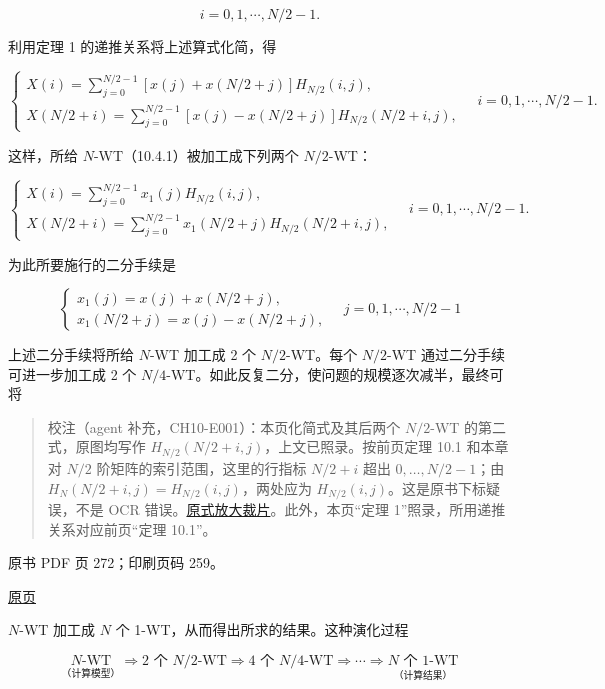 \[
i=0,1,\cdots,N/2-1.
\]

利用定理 1 的递推关系将上述算式化简，得

\[
\begin{cases}
\displaystyle X(i)=\sum_{j=0}^{N/2-1}[x(j)+x(N/2+j)]H_{N/2}(i,j),\\[6pt]
\displaystyle X(N/2+i)=\sum_{j=0}^{N/2-1}[x(j)-x(N/2+j)]H_{N/2}(N/2+i,j),
\end{cases}\quad i=0,1,\cdots,N/2-1.
\]

这样，所给 \(N\)-WT（10.4.1）被加工成下列两个 \(N/2\)-WT：

\[
\begin{cases}
\displaystyle X(i)=\sum_{j=0}^{N/2-1}x_1(j)H_{N/2}(i,j),\\[6pt]
\displaystyle X(N/2+i)=\sum_{j=0}^{N/2-1}x_1(N/2+j)H_{N/2}(N/2+i,j),
\end{cases}\quad i=0,1,\cdots,N/2-1.
\]

为此所要施行的二分手续是

\[
\begin{cases}
x_1(j)=x(j)+x(N/2+j),\\
x_1(N/2+j)=x(j)-x(N/2+j),
\end{cases}\quad j=0,1,\cdots,N/2-1
\tag{10.4.2}
\]

上述二分手续将所给 \(N\)-WT 加工成 2 个 \(N/2\)-WT。每个 \(N/2\)-WT 通过二分手续可进一步加工成 2 个 \(N/4\)-WT。如此反复二分，使问题的规模逐次减半，最终可将

\begin{quote}
校注（agent 补充，CH10-E001）：本页化简式及其后两个 \(N/2\)-WT 的第二式，原图均写作 \(H_{N/2}(N/2+i,j)\)，上文已照录。按前页定理 10.1 和本章对 \(N/2\) 阶矩阵的索引范围，这里的行指标 \(N/2+i\) 超出 \(0,\ldots,N/2-1\)；由 \(H_N(N/2+i,j)=H_{N/2}(i,j)\)，两处应为 \(H_{N/2}(i,j)\)。这是原书下标疑误，不是 OCR 错误。\href{verified/assets/ch10/erratum-p271-indices.png}{原式放大裁片}。此外，本页``定理 1''照录，所用递推关系对应前页``定理 10.1''。
\end{quote}

\clearpage

原书 PDF 页 272；印刷页码 259。

\href{source-images/pdf-272.jpeg}{原页}

\(N\)-WT 加工成 \(N\) 个 1-WT，从而得出所求的结果。这种演化过程

\[
\underset{\text{（计算模型）}}{N\text{-WT}}\Rightarrow2\text{ 个 }N/2\text{-WT}\Rightarrow4\text{ 个 }N/4\text{-WT}\Rightarrow\cdots\Rightarrow\underset{\text{（计算结果）}}{N\text{ 个 }1\text{-WT}}
\]

